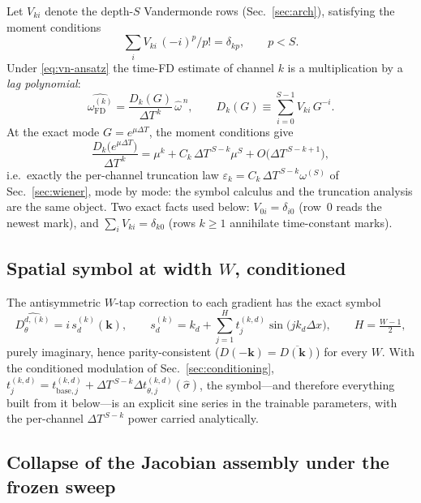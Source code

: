 \documentclass[11pt]{article}
\theoremstyle{plain}
\theoremstyle{definition}
\newcommand{\DT}{\Delta T}
\begin{document}
Let $V_{ki}$ denote the depth-$S$ Vandermonde rows (Sec.~\ref{sec:arch}),
satisfying the moment conditions
\begin{equation*}
\textstyle\sum_i V_{ki}\,(-i)^p/p!=\delta_{kp},\qquad p<S.
\end{equation*} Under
\eqref{eq:vn-ansatz} the time-FD estimate of channel $k$ is a
multiplication by a \emph{lag polynomial}:
\begin{equation}
\widehat{\omega^{(k)}_{\mathrm{FD}}}
=\frac{D_k(G)}{\DT^{\,k}}\,\hat\omega^{\,n},
\qquad
D_k(G)\equiv\sum_{i=0}^{S-1}V_{ki}\,G^{-i}.
\label{eq:vn-Dk}
\end{equation}
At the exact mode $G=e^{\mu\DT}$, the moment conditions give
\begin{equation}
\frac{D_k\!\bigl(e^{\mu\DT}\bigr)}{\DT^{\,k}}
=\mu^{k}+C_k\,\DT^{\,S-k}\mu^{S}
+O\bigl(\DT^{\,S-k+1}\bigr),
\label{eq:vn-consistency}
\end{equation}
i.e.\ exactly the per-channel truncation law
$\varepsilon_k=C_k\,\DT^{\,S-k}\omega^{(S)}$ of Sec.~\ref{sec:wiener}, mode by mode:
the symbol calculus and the truncation analysis are the same object. Two
exact facts used below: $V_{0i}=\delta_{i0}$ (row~0 reads the newest
mark), and $\sum_i V_{ki}=\delta_{k0}$ (rows $k\ge1$ annihilate
time-constant marks).

\subsection{Spatial symbol at width $W$, conditioned}

The antisymmetric $W$-tap correction to each gradient has the exact symbol
\begin{equation}
\widehat{D^{d,(k)}_\theta}=i\,s^{(k)}_d(\mathbf{k}),\qquad
s^{(k)}_d=k_d+\sum_{j=1}^{H}t^{(k,d)}_{j}\sin\bigl(jk_d\Delta x\bigr),
\qquad H=\tfrac{W-1}{2},
\label{eq:vn-taps}
\end{equation}
purely imaginary, hence parity-consistent
($D(-\mathbf{k})=\overline{D(\mathbf{k})}$) for every $W$. With the
conditioned modulation of Sec.~\ref{sec:conditioning},
$t^{(k,d)}_j=t^{(k,d)}_{\mathrm{base},j}
+\DT^{\,S-k}\Delta t^{(k,d)}_{\theta,j}(\hat\sigma)$, the symbol---and
therefore everything built from it below---is an explicit sine series in
the trainable parameters, with the per-channel $\DT^{\,S-k}$ power carried
analytically.

\subsection{Collapse of the Jacobian assembly under the frozen sweep}
\end{document}
